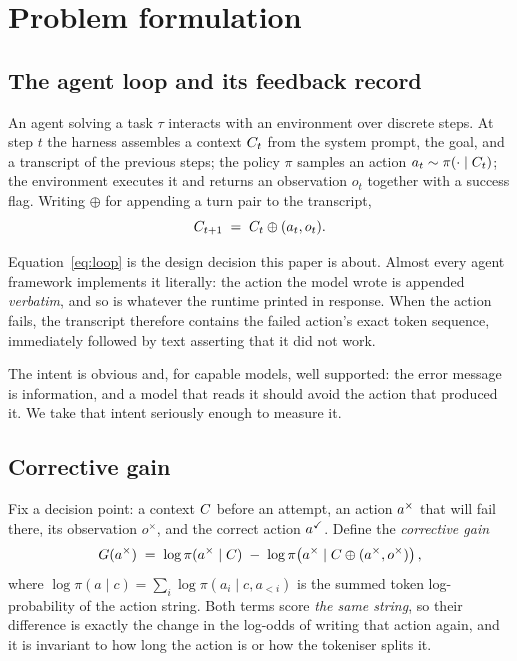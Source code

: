 \section{Problem formulation}
\label{sec:problem}

\subsection{The agent loop and its feedback record}

An agent solving a task $\tau$ interacts with an environment over discrete
steps. At step $t$ the harness assembles a context $C_t$ from the system
prompt, the goal, and a transcript of the previous steps; the policy $\pi$
samples an action $a_t \sim \pi(\cdot \mid C_t)$; the environment executes
it and returns an observation $o_t$ together with a success flag. Writing
$\oplus$ for appending a turn pair to the transcript,
\begin{equation}
C_{t+1} \;=\; C_t \oplus (a_t, o_t).
\label{eq:loop}
\end{equation}

Equation~\eqref{eq:loop} is the design decision this paper is about. Almost every
agent framework implements it literally: the action the model wrote is appended
\emph{verbatim}, and so is whatever the runtime printed in response. When the
action fails, the transcript therefore contains the failed action's exact token
sequence, immediately followed by text asserting that it did not work.

The intent is obvious and, for capable models, well supported: the error message
is information, and a model that reads it should avoid the action that produced
it. We take that intent seriously enough to measure it.

\subsection{Corrective gain}

Fix a decision point: a context $C$ before an attempt, an action
$a^{\times}$ that will fail there, its observation $o^{\times}$, and the correct
action $a^{\checkmark}$. Define the \emph{corrective gain}
\begin{equation}
G(a^{\times}) \;=\;
\log \pi(a^{\times} \mid C)
\;-\;
\log \pi\!\left(a^{\times} \mid C \oplus (a^{\times}, o^{\times})\right),
\label{eq:gain}
\end{equation}
where $\log \pi(a \mid c) = \sum_{i} \log \pi(a_i \mid c, a_{<i})$ is the summed
token log-probability of the action string. Both terms score \emph{the same
string}, so their difference is exactly the change in the log-odds of writing
that action again, and it is invariant to how long the action is or how the
tokeniser splits it.

